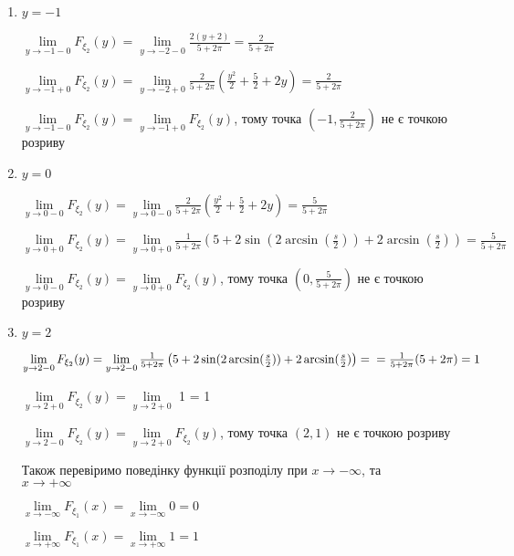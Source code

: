 \documentclass[a4paper, 20pt, titlepage]{article}
\begin{document}
\begin{spacing}{1.4}
\begin{enumerate}
\item $y = -1$

$\lim \limits_{y \to -1 -0} F_{\xi_2}(y) = \lim \limits_{y \to -2 -0} \frac{2(y+2)}{5+2\pi} = \frac{2}{5+2\pi}$

$\lim \limits_{y \to -1 +0} F_{\xi_2}(y) = \lim \limits_{y \to -2 +0}  \frac{2}{5+2\pi} \left( \frac{y^2}{2} + \frac{5}{2} + 2y \right) = \frac{2}{5+2\pi}$

$\lim \limits_{y \to -1 -0} F_{\xi_2}(y) = \lim \limits_{y \to -1 +0} F_{\xi_2}(y)$, тому точка $(-1, \frac{2}{5+2\pi})$ не є точкою розриву

\item $y = 0$

$\lim \limits_{y \to 0 -0} F_{\xi_2}(y) = \lim \limits_{y \to 0 -0} \frac{2}{5+2\pi} \left( \frac{y^2}{2} + \frac{5}{2} + 2y \right)  = \frac{5}{5+ 2\pi}$

$\lim \limits_{y \to 0 +0} F_{\xi_2}(y) = \lim \limits_{y \to 0 +0}  \frac{1}{5+2\pi} \left(5+ 2\sin(2\arcsin(\frac{s}{2})) + 2\arcsin(\frac{s}{2}) \right) = \frac{5}{5+2\pi}$

$\lim \limits_{y \to 0 -0} F_{\xi_2}(y) = \lim \limits_{y \to 0 +0} F_{\xi_2}(y)$, тому точка $(0, \frac{5}{5+2\pi})$ не є точкою розриву

\item $y = 2$

$\lim \limits_{y \to 2 -0} F_{\xi_2}(y) = \lim \limits_{y \to 2 -0}  \frac{1}{5+2\pi} \left(5+ 2\sin(2\arcsin(\frac{s}{2})) + 2\arcsin(\frac{s}{2}) \right)  = \\ =
\frac{1}{5+2\pi}(5+ 2\pi) = 1$

$\lim \limits_{y \to 2 +0} F_{\xi_2}(y) = \lim \limits_{y \to 2 +0}$  1 = 1

$\lim \limits_{y \to 2 -0} F_{\xi_2}(y) = \lim \limits_{y \to 2 +0} F_{\xi_2}(y)$, тому точка $(2, 1)$ не є точкою розриву

\vspace{4mm}
Також перевіримо поведінку функції розподілу при $x \to - \infty$, та \\ $x \to +\infty$  

$ \lim \limits_{x \to - \infty} F_{\xi_1}(x)= \lim \limits_{x \to -\infty}0 = 0$

\vspace{3mm}
$ \lim \limits_{x \to +\infty} F_{\xi_1}(x)= \lim \limits_{x \to +\infty}1 = 1$

\end{enumerate}

\vspace{3mm}

\end{spacing}
\end{document}
